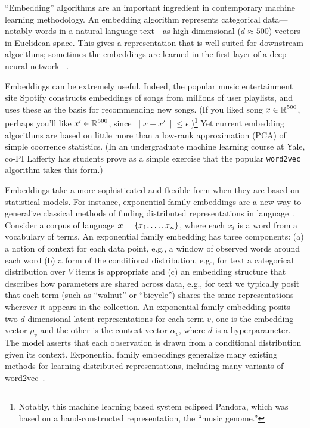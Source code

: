 \statbackground{}
``Embedding'' algorithms are an important ingredient in contemporary
machine learning methodology. An embedding algorithm represents 
categorical data---notably words in a natural language text---as
high dimensional ($d\approx 500$) vectors in Euclidean space. 
This gives a representation that is well suited for downstream
algorithms; sometimes the embeddings are learned in the first layer of
a deep neural network ~\citep{Bengio:2003,Mikolov:2013}.  

Embeddings can be extremely useful. Indeed, the popular music
entertainment site Spotify constructs embeddings of songs from
millions of user playlists, and uses these as the basis for
recommending new songs.  (If you liked song $x\in\mbox{$\mathbb{R}$}^{500}$,
perhaps you'll like $x'\in\mbox{$\mathbb{R}$}^{500}$, since
$\|x-x'\|\leq \epsilon$.)\footnote{Notably, this machine learning based
system eclipsed Pandora, which was based on a hand-constructed
representation, the ``music genome.''} Yet current embedding
algorithms are based on little more than a low-rank approximation
(PCA) of simple coorrence statistics. (In an undergraduate machine
learning course at Yale, co-PI Lafferty has students prove as a simple
exercise that the popular \texttt{word2vec} algorithm takes this form.)

Embeddings take a more sophisticated and flexible form when they are based
on statistical models. For instance, exponential family embeddings are a new way to
generalize classical methods of finding distributed representations in
language~\citep{Rudolph:2016b}.
Consider a corpus of language $\boldsymbol{x} = \{x_1, \ldots, x_n\}$, where
each $x_i$ is a word from a vocabulary of terms. An exponential family
embedding has three components: (a) a notion of context for
each data point, e.g., a window of observed words around each word (b)
a form of the conditional distribution, e.g., for text a
categorical distribution over $V$ items is appropriate and (c) an
embedding structure that describes how parameters are shared
across data, e.g., for text we typically posit that each term (such as
``walnut'' or ``bicycle'') shares the same representations wherever it
appears in the collection.
An exponential family embedding
posits two $d$-dimensional latent representations for each term $v$,
one is the embedding vector $\rho_v$ and the other is the
context vector $\alpha_v$, where $d$ is a hyperparameter.  The
model asserts that each observation is drawn from a conditional
distribution given its context. 
Exponential family embeddings generalize many existing methods for
learning distributed representations, including 
many variants of word2vec~\citep{Bengio:2003,Mikolov:2013}.  


